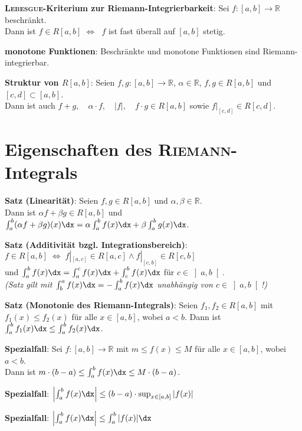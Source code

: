 \textbf{\textsc{Lebesgue}-Kriterium zur Riemann-Integrierbarkeit}:
Sei $f: [a,b] \rightarrow \mathbb{R}$ beschränkt. \\
Dann ist $f \in R[a,b] \;\Leftrightarrow\;$
$f$ ist fast überall auf $[a,b]$ stetig.

\textbf{monotone Funktionen}:
Beschränkte und monotone Funktionen sind Riemann-integrierbar.

\textbf{Struktur von $R[a,b]$}:
Seien $f, g: [a,b] \rightarrow \mathbb{R}$,
$\alpha \in \mathbb{R}$,
$f, g \in R[a,b]$ und
$[c,d] \subset [a,b]$. \\
Dann ist auch $f + g,\quad \alpha \cdot f,\quad |f|,\quad f \cdot g \in R[a,b]$
sowie $f|_{[c,d]} \in R[c,d]$.

\section{%
    Eigenschaften des \textsc{Riemann}-Integrals%
}

\textbf{Satz (Linearität)}:
Seien $f, g \in R[a,b]$ und $\alpha, \beta \in \mathbb{R}$. \\
Dann ist $\alpha f + \beta g \in R[a,b]$ und
$\int_a^b (\alpha f + \beta g)(x)\dx =
\alpha \int_a^b f(x)\dx + \beta \int_a^b g(x)\dx$.

\textbf{Satz (Additivität bzgl. Integrationsbereich)}: \\
$f \in R[a,b] \;\Leftrightarrow\;
f|_{[a,c]} \in R[a,c] \land f|_{[c,b]} \in R[c,b]$ \\
und $\int_a^b f(x)\dx = \int_a^c f(x)\dx + \int_c^b f(x)\dx$
für $c \in \left]a,b\right[$. \\
\emph{(Satz gilt mit $\int_b^a f(x)\dx = -\int_a^b f(x)\dx$ unabhängig von
$c \in \left]a,b\right[$!)}

\textbf{Satz (Monotonie des Riemann-Integrals)}:
Seien $f_1, f_2 \in R[a,b]$ mit $f_1(x) \le f_2(x)$ für alle $x \in [a,b]$,
wobei $a < b$. \qquad
Dann ist $\int_a^b f_1(x)\dx \le \int_a^b f_2(x)\dx$.

\textbf{Spezialfall}:
Sei $f: [a,b] \rightarrow \mathbb{R}$ mit $m \le f(x) \le M$ für alle
$x \in [a,b]$, wobei $a < b$. \\
Dann ist $m \cdot (b - a) \le \int_a^b f(x)\dx \le M \cdot (b - a)$.

\textbf{Spezialfall}:
$\left|\int_a^b f(x)\dx\right| \le (b - a) \cdot \sup_{x \in [a,b]} |f(x)|$

\textbf{Spezialfall}:
$\left|\int_a^b f(x)\dx\right| \le \int_a^b |f(x)|\dx$

